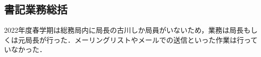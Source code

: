\subsection*{書記業務総括}


2022年度春学期は総務局内に局長の古川しか局員がいないため，業務は局長もしくは元局長が行った．メーリングリストやメールでの送信といった作業は行っていなかった．
